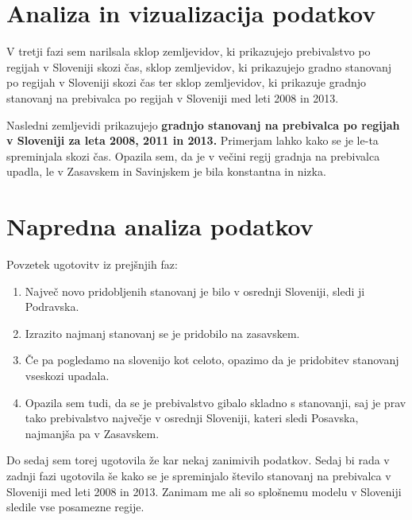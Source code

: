 \documentclass[11pt,a4paper]{article}
\begin{document}
\makebox[\textwidth][c]{

}

\newpage
\section{Analiza in vizualizacija podatkov}

V tretji fazi sem narilsala sklop zemljevidov, ki prikazujejo prebivalstvo po regijah v Sloveniji skozi čas, sklop zemljevidov, ki prikazujejo gradno stanovanj po regijah v Sloveniji skozi čas ter sklop zemljevidov, ki prikazuje gradnjo stanovanj na prebivalca po regijah v Sloveniji med leti 2008 in 2013.

\newpage
Nasledni zemljevidi prikazujejo \textbf{gradnjo stanovanj na prebivalca po regijah v Sloveniji za leta 2008, 2011 in 2013.} Primerjam lahko kako se je le-ta spreminjala skozi čas. Opazila sem, da je v večini regij gradnja na prebivalca upadla, le v Zasavskem in Savinjskem je bila konstantna in nizka.

\vspace{5mm}
\vspace{5mm}

\section{Napredna analiza podatkov}

Povzetek ugotovitv iz prejšnjih faz:
\begin{enumerate} 
\item{Največ novo pridobljenih stanovanj je bilo v osrednji Sloveniji, sledi ji Podravska.}
\item{Izrazito najmanj stanovanj se je pridobilo na zasavskem.}
\item{Če pa pogledamo na slovenijo kot celoto, opazimo da je pridobitev stanovanj vseskozi upadala.}
\item{Opazila sem tudi, da se je prebivalstvo gibalo skladno s stanovanji, saj je prav tako prebivalstvo največje v osrednji Sloveniji, kateri sledi Posavska, najmanjša pa v Zasavskem.}
\end{enumerate}

Do sedaj sem torej ugotovila že kar nekaj zanimivih podatkov. Sedaj bi rada v zadnji fazi ugotovila še kako se je spreminjalo število stanovanj na prebivalca v Sloveniji med leti 2008 in 2013. Zanimam me ali so splošnemu modelu v Sloveniji sledile vse posamezne regije.
\end{document}
